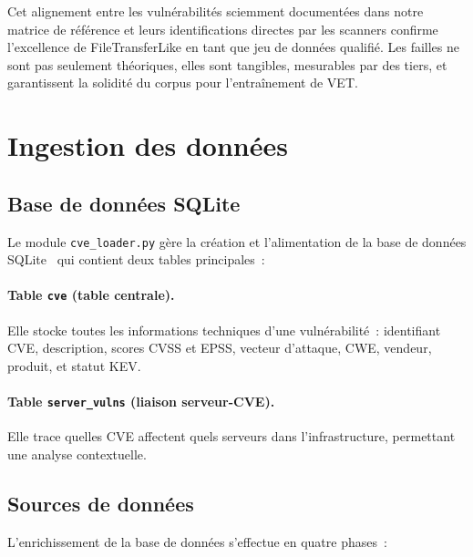 \documentclass[runningheads]{llncs}
\begin{document}
Cet alignement entre les vulnérabilités sciemment documentées dans notre matrice de référence et leurs identifications directes par les scanners confirme l'excellence de FileTransferLike en tant que jeu de données qualifié. Les failles ne sont pas seulement théoriques, elles sont tangibles, mesurables par des tiers, et garantissent la solidité du corpus pour l'entraînement de VET.


\section{Ingestion des données}

\subsection{Base de données SQLite}

Le module \texttt{cve\_loader.py} gère la création et l'alimentation de la base de données SQLite~\cite{sqlite2024} qui contient deux tables principales~:

\paragraph{Table \texttt{cve} (table centrale).} Elle stocke toutes les informations techniques d'une vulnérabilité~: identifiant CVE, description, scores CVSS et EPSS, vecteur d'attaque, CWE, vendeur, produit, et statut KEV.

\paragraph{Table \texttt{server\_vulns} (liaison serveur-CVE).} Elle trace quelles CVE affectent quels serveurs dans l'infrastructure, permettant une analyse contextuelle.

\subsection{Sources de données}

L'enrichissement de la base de données s'effectue en quatre phases~:
\end{document}
